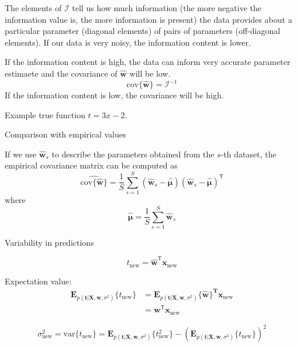 \documentclass[a4paper,11pt]{article} %
\begin{document}
The elements of $\mathcal{I}$ tell us how much information (the more negative the
information value is, the more information is present) the data provides about
a particular parameter (diagonal elements) of pairs of parameters (off-diagonal elements).
If our data is very noisy, the information content is lower.

If the information content is high, the data can inform very accurate parameter
estimaete and the covariance of $\hat{\mathbf{w}}$ will be low.
\begin{equation*}
\mathrm{cov}\{\hat{\mathbf{w}}\} = \mathcal{I}^{-1}
\end{equation*}
If the information content is low, the covariance will be high.

Example true function $t = 3x - 2$.

Comparison with empirical values


If we use $\hat{\mathbf{w}}_{s}$ to describe the parameters obtained from the $s$-th
dataset, the empirical covariance matrix can be computed as
\begin{equation*}
\widehat{ \mathrm{cov} \{ \hat{\mathbf{w}} \} } = \frac{1}{S} \sum_{s=1}^{S}
\left( \hat{\mathbf{w}}_{s} - \hat{\boldsymbol{\mu}} \right)
\left( \hat{\mathbf{w}}_{s} - \hat{\boldsymbol{\mu}} \right)^{\mathsf{T}}
\end{equation*}
where
\begin{equation*}
\hat{\boldsymbol{\mu}} = \frac{1}{S} \sum_{s=1}^{S} \hat{\mathbf{w}}_{s}
\end{equation*}

Variability in predictions

\begin{equation}
t_{\mathrm{new}} = \hat{\mathbf{w}}^{\mathsf{T}}\mathbf{x}_{\mathrm{new}}
\end{equation}

Expectation value:
\begin{align*}
\mathbf{E}_{p(\mathbf{t}|\mathbf{X},\mathbf{w},\sigma^2)}\{t_{\mathrm{new}}\} & =
\mathbf{E}_{p(\mathbf{t}|\mathbf{X},\mathbf{w},\sigma^2)}\{\hat{\mathbf{w}}\}^{\mathbf{T}}
\mathbf{x}_{\mathrm{new}} \\
& = \mathbf{w}^{\mathsf{T}}\mathbf{x}_{\mathrm{new}}
\end{align*}


\begin{equation}
\sigma^2_{\mathrm{new}} = \mathrm{var}\{t_{\mathrm{new}}\} =
\mathbf{E}_{p(\mathbf{t}|\mathbf{X},\mathbf{w},\sigma^2)}\{t^{2}_{\mathrm{new}}\} -
(\mathbf{E}_{p(\mathbf{t}|\mathbf{X},\mathbf{w},\sigma^2)}\{t_{\mathrm{new}}\})^{2}
\end{equation}
\end{document}
